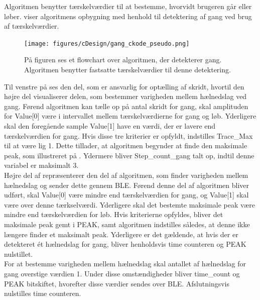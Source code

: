Algoritmen benytter tærskelværdier til at bestemme, hvorvidt brugeren går eller løber.  viser algoritmens opbygning med henhold til detektering af gang ved brug af tærskelværdier.
\begin{figure}[H]
	\centering
	\texttt{[image: figures/cDesign/gang\_ckode\_pseudo.png]}
	\caption{På figuren ses et flowchart over algoritmen, der detekterer gang. Algoritmen benytter fastsatte tærskelværdier til denne detektering.}
	\label{fig:gang_pseudo}
\end{figure} \vspace{-0.5cm}
Til venstre på  ses den del, som er ansvarlig for optælling af skridt, hvortil den højre del visualiserer delen, som bestemmer varigheden mellem hælnedslag ved gang. Førend algoritmen kan tælle op på antal skridt for gang, skal amplituden for Value[0] være i intervallet mellem tærskelværdierne for gang og løb. Yderligere skal den foregående sample Value[1] have en værdi, der er lavere end tærskelværdien for gang. Hvis disse tre kriterier er opfyldt, indstilles Trace\_Max til at være lig 1. Dette tillader, at algoritmen begynder at finde den maksimale peak, som illustreret på . Ydermere bliver Step\_count\_gang talt op, indtil denne variabel er maksimalt 3. \\
Højre del af  repræsenterer den del af algoritmen, som finder varigheden mellem hælnedslag og sender dette gennem BLE. Førend denne del af algoritmen bliver udført, skal Value[0] være mindre end tærskelværdien for gang, og Value[1] skal være over denne tærkselværdi. Yderligere skal det bestemte maksimale peak være mindre end tærskelværdien for løb. Hvis kriterierne opfyldes, bliver det maksimale peak gemt i PEAK, samt algoritmen indstilles således, at denne ikke længere finder et maksimalt peak. Yderligere er det gældende, at hvis der er detekteret ét hælnedslag for gang, bliver henholdsvis time counteren og PEAK nulstillet. \\
For at bestemme varigheden mellem hælnedslag skal antallet af hælnedslag for gang overstige værdien 1. Under disse omstændigheder bliver time\_count og PEAK bitskiftet, hvorefter disse værdier sendes over BLE. Afslutningsvis nulstilles time counteren.

